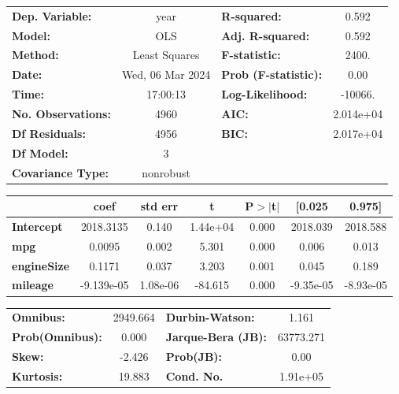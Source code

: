 \documentclass[
  letterpaper,
  DIV=11,
  numbers=noendperiod]{scrreprt}
\begin{document}
\begin{center}
\begin{tabular}{lclc}
\toprule
\textbf{Dep. Variable:}    &       year       & \textbf{  R-squared:         } &     0.592   \\
\textbf{Model:}            &       OLS        & \textbf{  Adj. R-squared:    } &     0.592   \\
\textbf{Method:}           &  Least Squares   & \textbf{  F-statistic:       } &     2400.   \\
\textbf{Date:}             & Wed, 06 Mar 2024 & \textbf{  Prob (F-statistic):} &     0.00    \\
\textbf{Time:}             &     17:00:13     & \textbf{  Log-Likelihood:    } &   -10066.   \\
\textbf{No. Observations:} &        4960      & \textbf{  AIC:               } & 2.014e+04   \\
\textbf{Df Residuals:}     &        4956      & \textbf{  BIC:               } & 2.017e+04   \\
\textbf{Df Model:}         &           3      & \textbf{                     } &             \\
\textbf{Covariance Type:}  &    nonrobust     & \textbf{                     } &             \\
\bottomrule
\end{tabular}
\begin{tabular}{lcccccc}
                    & \textbf{coef} & \textbf{std err} & \textbf{t} & \textbf{P$> |$t$|$} & \textbf{[0.025} & \textbf{0.975]}  \\
\midrule
\textbf{Intercept}  &    2018.3135  &        0.140     &  1.44e+04  &         0.000        &     2018.039    &     2018.588     \\
\textbf{mpg}        &       0.0095  &        0.002     &     5.301  &         0.000        &        0.006    &        0.013     \\
\textbf{engineSize} &       0.1171  &        0.037     &     3.203  &         0.001        &        0.045    &        0.189     \\
\textbf{mileage}    &   -9.139e-05  &     1.08e-06     &   -84.615  &         0.000        &    -9.35e-05    &    -8.93e-05     \\
\bottomrule
\end{tabular}
\begin{tabular}{lclc}
\textbf{Omnibus:}       & 2949.664 & \textbf{  Durbin-Watson:     } &     1.161  \\
\textbf{Prob(Omnibus):} &   0.000  & \textbf{  Jarque-Bera (JB):  } & 63773.271  \\
\textbf{Skew:}          &  -2.426  & \textbf{  Prob(JB):          } &      0.00  \\
\textbf{Kurtosis:}      &  19.883  & \textbf{  Cond. No.          } &  1.91e+05  \\
\bottomrule
\end{tabular}
\end{center}
\end{document}
